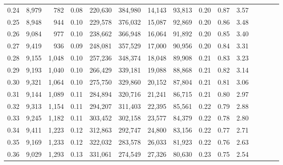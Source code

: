\begin{tabular}{rrrcrrrrrrrrrrr}
0.24 &   8,979 &     782 &                                       0.08 &  220,630 &  384,980 &   14,143 &   93,813 &  0.20 &  0.87 &                         3.57 \\
0.25 &   8,948 &     944 &                                       0.10 &  229,578 &  376,032 &   15,087 &   92,869 &  0.20 &  0.86 &                         3.48 \\
0.26 &   9,084 &     977 &                                       0.10 &  238,662 &  366,948 &   16,064 &   91,892 &  0.20 &  0.85 &                         3.40 \\
0.27 &   9,419 &     936 &                                       0.09 &  248,081 &  357,529 &   17,000 &   90,956 &  0.20 &  0.84 &                         3.31 \\
0.28 &   9,155 &   1,048 &                                       0.10 &  257,236 &  348,374 &   18,048 &   89,908 &  0.21 &  0.83 &                         3.23 \\
0.29 &   9,193 &   1,040 &                                       0.10 &  266,429 &  339,181 &   19,088 &   88,868 &  0.21 &  0.82 &                         3.14 \\
0.30 &   9,321 &   1,064 &                                       0.10 &  275,750 &  329,860 &   20,152 &   87,804 &  0.21 &  0.81 &                         3.06 \\
0.31 &   9,144 &   1,089 &                                       0.11 &  284,894 &  320,716 &   21,241 &   86,715 &  0.21 &  0.80 &                         2.97 \\
0.32 &   9,313 &   1,154 &                                       0.11 &  294,207 &  311,403 &   22,395 &   85,561 &  0.22 &  0.79 &                         2.88 \\
0.33 &   9,245 &   1,182 &                                       0.11 &  303,452 &  302,158 &   23,577 &   84,379 &  0.22 &  0.78 &                         2.80 \\
0.34 &   9,411 &   1,223 &                                       0.12 &  312,863 &  292,747 &   24,800 &   83,156 &  0.22 &  0.77 &                         2.71 \\
0.35 &   9,169 &   1,233 &                                       0.12 &  322,032 &  283,578 &   26,033 &   81,923 &  0.22 &  0.76 &                         2.63 \\
0.36 &   9,029 &   1,293 &                                       0.13 &  331,061 &  274,549 &   27,326 &   80,630 &  0.23 &  0.75 &                         2.54 \\

\end{tabular}
